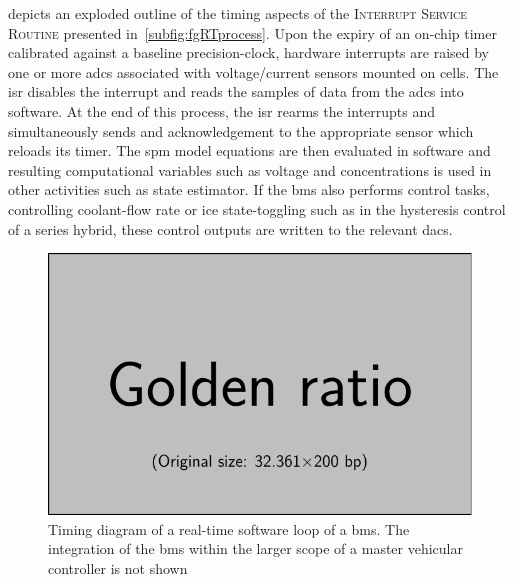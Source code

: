  depicts an exploded outline of the timing aspects of
the \textsc{Interrupt  Service Routine}  presented in~\cref{subfig:fgRTprocess}.
Upon   the  expiry   of  an   on-chip  timer   calibrated  against   a  baseline
precision-clock,  hardware  interrupts are  raised  by  one or  more  \gls{adc}s
associated with voltage/current sensors mounted on cells. The \gls{isr} disables
the  interrupt  and  reads  the  samples   of  data  from  the  \gls{adc}s  into
software. At  the end of this  process, the \gls{isr} rearms  the interrupts and
simultaneously sends and acknowledgement to the appropriate sensor which reloads
its timer.  The \gls{spm}  model equations  are then  evaluated in  software and
resulting computational variables such as  voltage and concentrations is used in
other activities  such as state estimator.  If the \gls{bms} also performs  control
tasks, \eg{} controlling coolant-flow rate or \gls{ice} state-toggling
such as in the hysteresis control of a series hybrid, these control outputs are written
to the relevant \gls{dac}s.

\begin{figure}[htb]
    \centering
    \includegraphics[width=\textwidth]{placeholder_images/example-image-golden.pdf}
    \caption[Timing diagram of a real-time software loop of a \gls{bms}]
    {Timing diagram of a real-time software loop of a \gls{bms}. The integration  of the  \gls{bms} within  the larger  scope of  a master  vehicular controller is not shown}
    \label{fig:timingdiagramBig}
\end{figure}







